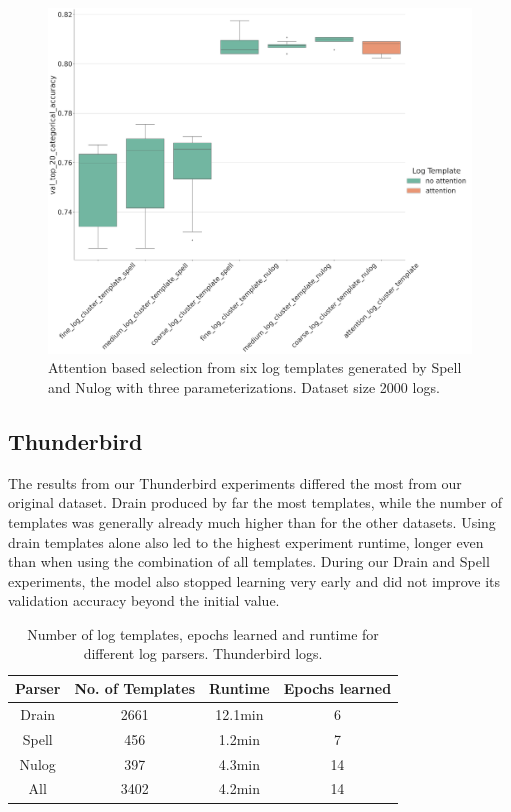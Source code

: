 \begin{figure}[H]
    \centering
    \includegraphics[keepaspectratio=true,scale=0.2]{figures/5_results/spell_nulog_hdfs.png}
    \caption{Attention based selection from six log templates generated by Spell and Nulog with three parameterizations. Dataset size 2000 logs.}
    \label{fig:spell_nulog_hdfs}
\end{figure}

\subsection{Thunderbird}
The results from our Thunderbird experiments differed the most from our original dataset. Drain produced by far the most templates, while the number of templates was generally already much higher than for the other datasets. Using drain templates alone also led to the highest experiment runtime, longer even than when using the combination of all templates. During our Drain and Spell experiments, the model also stopped learning very early and did not improve its validation accuracy beyond the initial value. 

\begin{table}[htbp]
  \centering
  \begin{tabular}{cccc}
    \hline
    \textbf{Parser} & \textbf{No. of Templates} & \textbf{Runtime} & \textbf{Epochs learned} \\
    \hline
    Drain & 2661  & 12.1min & 6 \\
    Spell & 456   & 1.2min & 7 \\
    Nulog & 397  & 4.3min & 14 \\
    All & 3402 & 4.2min & 14 \\
    \hline
  \end{tabular}
  \caption{Number of log templates, epochs learned and runtime for different log parsers. Thunderbird logs. }
  \label{tab:thunderbird}
\end{table}

